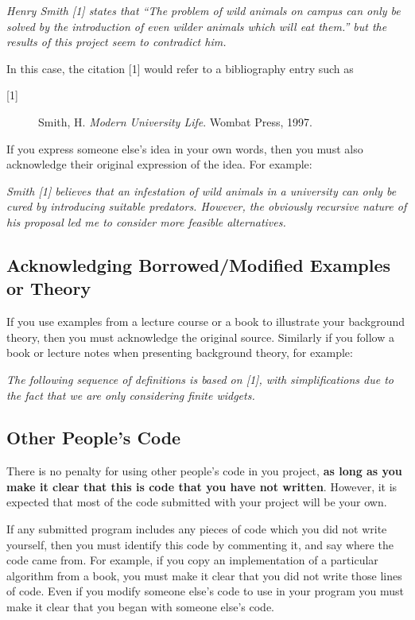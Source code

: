 \documentclass[11pt]{article}
\begin{document}
\textit{Henry Smith [1] states that ``The problem of wild animals on campus can only be solved by the introduction of even wilder animals which will eat them.'' but the results of this project seem to contradict him.}

In this case, the citation [1] would refer to a bibliography entry
such as\vspace*{-1mm}
\begin{description}
\item[{[1]}]Smith, H. \textit{Modern University Life}. Wombat Press, 1997.
\end{description}
\vspace*{-1mm}

If you express someone else's idea in your own words, then you must also acknowledge their original expression of the idea. For example:

\textit{Smith [1] believes that an infestation of wild animals in a university can only be cured by introducing suitable predators. However, the obviously recursive nature of his proposal led me to consider more feasible alternatives.}

\subsection{Acknowledging Borrowed/Modified Examples or Theory}
If you use examples from a lecture course or a book to illustrate your background theory, then you must acknowledge the original source. Similarly if you follow a book or lecture notes when presenting background theory, for example:

\textit{The following sequence of definitions is based on [1], with simplifications due to the fact that we are only considering \emph{finite} widgets.}

\subsection{Other People's Code}
There is no penalty for using other people's code in you project, \textbf{as long as you make it clear that this is code that you have not written}.  However, it is expected that most of the code submitted with your project will be your own.

If any submitted program includes any pieces of code which you did not write yourself, then you must identify this code  by  commenting it, and say where the code came from. For example, if you copy an implementation of a particular algorithm from a book, you must make it clear that you did not write those lines of code.
Even if you modify someone else's code to use in your program you must make it clear that you began with someone else's code.
\end{document}
